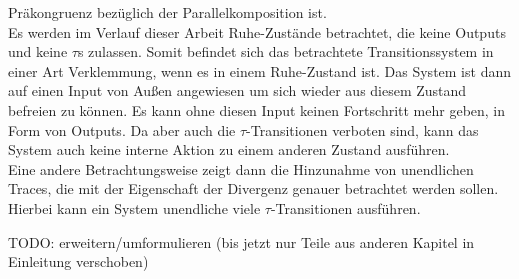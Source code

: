 Präkongruenz bezüglich der Parallelkomposition ist.\\
Es werden im Verlauf dieser Arbeit Ruhe-Zustände betrachtet, die keine Outputs
und keine $\tau$s zulassen. Somit befindet sich das betrachtete
Transitionssystem in einer Art Verklemmung, wenn es in einem Ruhe-Zustand ist.
Das System ist dann auf einen Input von Außen angewiesen um sich wieder aus
diesem Zustand befreien zu können. Es kann ohne diesen Input keinen Fortschritt
mehr geben, in Form von Outputs. Da aber auch die $\tau$-Transitionen verboten
sind, kann das System auch keine interne Aktion zu einem anderen Zustand
ausführen.\\
Eine andere Betrachtungsweise zeigt dann die Hinzunahme von unendlichen Traces,
die mit der Eigenschaft der Divergenz genauer betrachtet werden sollen. Hierbei
kann ein System unendliche viele $\tau$-Transitionen ausführen.

\scriptsize\textcolor{lgray}{TODO: erweitern/umformulieren (bis jetzt nur Teile
aus anderen Kapitel in Einleitung verschoben)}

\normalsize
